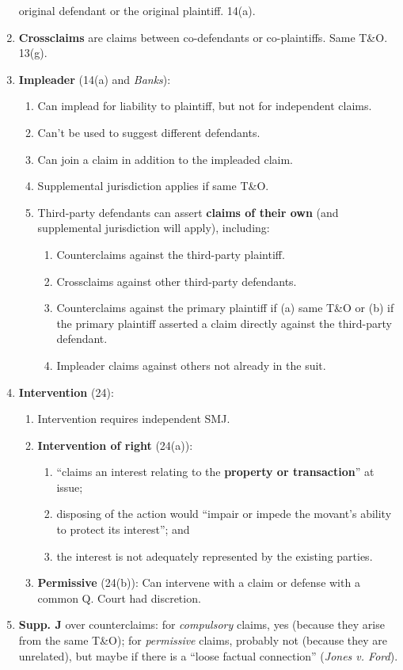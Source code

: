 \begin{enumerate}
    original defendant or the original plaintiff. 14(a).
    \item \textbf{Crossclaims} are claims between co-defendants or 
    co-plaintiffs. Same T\&O. 13(g).
    \item \textbf{Impleader} (14(a) and \emph{Banks}):
    \begin{enumerate}
        \item Can implead for liability to plaintiff, but not for independent 
        claims.
        \item Can't be used to suggest different defendants.
        \item Can join a claim in addition to the impleaded claim.
        \item Supplemental jurisdiction applies if same T\&O.
        \item Third-party defendants can assert \textbf{claims of their own} 
        (and supplemental jurisdiction will apply), including:
        \begin{enumerate}
            \item Counterclaims against the third-party plaintiff.
            \item Crossclaims against other third-party defendants.
            \item Counterclaims against the primary plaintiff if (a) same T\&O 
            or (b) if the primary plaintiff asserted a claim directly against 
            the third-party defendant.
            \item Impleader claims against others 
            not already in the suit.
        \end{enumerate}
    \end{enumerate}
    \item \textbf{Intervention} (24):
    \begin{enumerate}
        \item Intervention requires independent SMJ.
        \item \textbf{Intervention of right} (24(a)):
        \begin{enumerate}
            \item ``claims an interest relating to the \textbf{property or 
            transaction}'' at issue;
            \item disposing of the action would ``impair or impede the 
            movant's ability to protect its interest''; and
            \item the interest is not adequately represented by the existing 
            parties.
        \end{enumerate}
        \item \textbf{Permissive} (24(b)): Can intervene with a claim or 
        defense with a common Q. Court had discretion.
    \end{enumerate}
    \item \textbf{Supp. J} over counterclaims: for 
    \emph{compulsory} claims, yes (because they arise from the same 
    T\&O); for \emph{permissive} claims, probably not (because they are 
    unrelated), but maybe if there is a ``loose factual connection'' 
    (\emph{Jones v. Ford}).
\end{enumerate}

